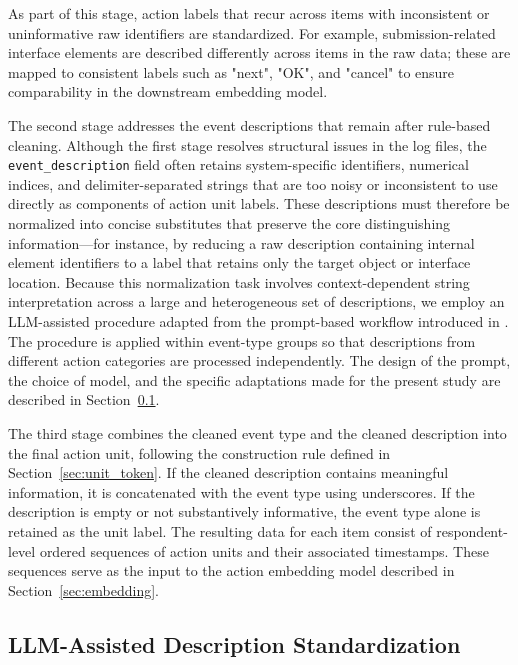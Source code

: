 \documentclass[A4paper,11pt]{article}
\begin{document}
As part of this stage, action labels that recur across items with inconsistent or uninformative raw identifiers are standardized. For example, submission-related interface elements are described differently across items in the raw data; these are mapped to consistent labels such as "next", "OK", and "cancel" to ensure comparability in the downstream embedding model.

The second stage addresses the event descriptions that remain after rule-based cleaning. Although the first stage resolves structural issues in the log files, the \texttt{event\_description} field often retains system-specific identifiers, numerical indices, and delimiter-separated strings that are too noisy or inconsistent to use directly as components of action unit labels. These descriptions must therefore be normalized into concise substitutes that preserve the core distinguishing information---for instance, by reducing a raw description containing internal element identifiers to a label that retains only the target object or interface location. Because this normalization task involves context-dependent string interpretation across a large and heterogeneous set of descriptions, we employ an LLM-assisted procedure adapted from the prompt-based workflow introduced in \citet{hwangbo2026tutorial}. The procedure is applied within event-type groups so that descriptions from different action categories are processed independently. The design of the prompt, the choice of model, and the specific adaptations made for the present study are described in Section~\ref{sec:llm_preprocessing}.

The third stage combines the cleaned event type and the cleaned description into the final action unit, following the construction rule defined in Section~\ref{sec:unit_token}. If the cleaned description contains meaningful information, it is concatenated with the event type using underscores. If the description is empty or not substantively informative, the event type alone is retained as the unit label. The resulting data for each item consist of respondent-level ordered sequences of action units and their associated timestamps. These sequences serve as the input to the action embedding model described in Section~\ref{sec:embedding}.

\subsection{LLM-Assisted Description Standardization}\label{sec:llm_preprocessing}
\end{document}
